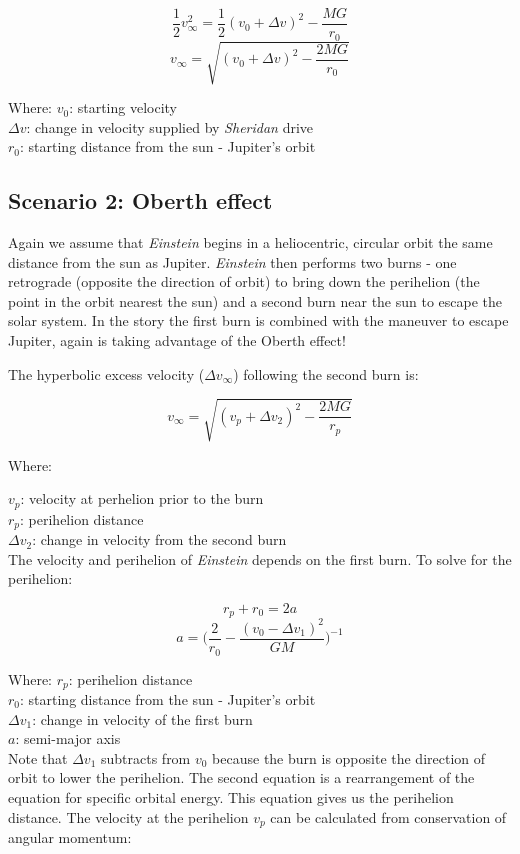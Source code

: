 \documentclass[12pt]{article} %
\begin{document}
$$\frac{1}{2}v_{\infty}^{2} = \frac{1}{2} (v_0 + \Delta v)^2 - \frac{MG}{r_0}$$
$$v_{\infty} = \sqrt{(v_0 + \Delta v)^2-\frac{2MG}{r_0}}$$

Where:
$v_0$: starting velocity\\
$\Delta v$: change in velocity supplied by \textit{Sheridan} drive\\
$r_0$: starting distance from the sun - Jupiter's orbit


\subsection{Scenario 2: Oberth effect}

Again we assume that \textit{Einstein} begins in a heliocentric, circular orbit the same distance from the sun as Jupiter. \textit{Einstein} then performs two burns - one retrograde (opposite the direction of orbit) to bring down the perihelion (the point in the orbit nearest the sun) and a second burn near the sun to escape the solar system. In the story the first burn is combined with the maneuver to escape Jupiter, again is taking advantage of the Oberth effect!

The hyperbolic excess velocity ($\Delta v_{\infty}$) following the second burn is:

$$v_{\infty} = \sqrt{(v_p + \Delta v_2)^2-\frac{2MG}{r_p}}$$

Where:

$v_p$: velocity at perhelion prior to the burn\\
$r_p$: perihelion distance\\
$\Delta v_2$: change in velocity from the second burn\\

The velocity and perihelion of \textit{Einstein} depends on the first burn. To solve for the perihelion:

$$r_p + r_0 = 2a$$
$$a = \bigg(\frac{2}{r_0} - \frac{(v_0-\Delta v_1)^2}{GM}\bigg)^{-1}$$

Where:
$r_p$: perihelion distance\\
$r_0$: starting distance from the sun - Jupiter's orbit\\
$\Delta v_1$: change in velocity of the first burn\\
$a$: semi-major axis\\

Note that $\Delta v_1$ subtracts from $v_0$ because the burn is opposite the direction of orbit to lower the perihelion. The second equation is a rearrangement of the equation for specific orbital energy. This equation gives us the perihelion distance. The velocity at the perihelion $v_p$ can be calculated from conservation of angular momentum:
\end{document}
